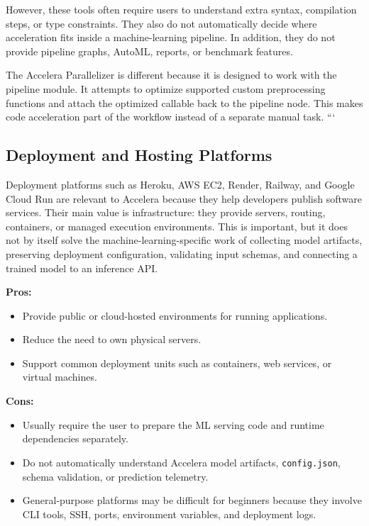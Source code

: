 \documentclass[12pt,a4paper]{report}
\begin{document}
\medskip
\noindent However, these tools often require users to understand extra syntax,
compilation steps, or type constraints. They also do not automatically decide
where acceleration fits inside a machine-learning pipeline. In addition, they do
not provide pipeline graphs, AutoML, reports, or benchmark features.

\medskip
\noindent The Accelera Parallelizer is different because it is designed to work with the
pipeline module. It attempts to optimize supported custom preprocessing
functions and attach the optimized callable back to the pipeline node. This makes
code acceleration part of the workflow instead of a separate manual task.
```


\subsection{Deployment and Hosting Platforms}

Deployment platforms such as Heroku, AWS EC2, Render, Railway, and Google Cloud
Run are relevant to Accelera because they help developers publish software
services. Their main value is infrastructure: they provide servers, routing,
containers, or managed execution environments. This is important, but it does
not by itself solve the machine-learning-specific work of collecting model
artifacts, preserving deployment configuration, validating input schemas, and
connecting a trained model to an inference API.

\textbf{Pros:}
\begin{itemize}
  \item Provide public or cloud-hosted environments for running applications.
  \item Reduce the need to own physical servers.
  \item Support common deployment units such as containers, web services, or
  virtual machines.
\end{itemize}

\textbf{Cons:}
\begin{itemize}
  \item Usually require the user to prepare the ML serving code and runtime
  dependencies separately.
  \item Do not automatically understand Accelera model artifacts,
  \texttt{config.json}, schema validation, or prediction telemetry.
  \item General-purpose platforms may be difficult for beginners because they
  involve CLI tools, SSH, ports, environment variables, and deployment logs.
\end{itemize}
\end{document}
